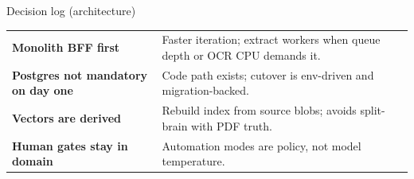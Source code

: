 \documentclass[aspectratio=169,11pt]{beamer}
\begin{document}
\begin{frame}{Decision log (architecture)}
  \small
  \begin{tabular}{p{3.3cm}p{8.2cm}}
    \textbf{Monolith BFF first} & Faster iteration; extract workers when queue depth or OCR CPU demands it. \\
    \textbf{Postgres not mandatory on day one} & Code path exists; cutover is env-driven and migration-backed. \\
    \textbf{Vectors are derived} & Rebuild index from source blobs; avoids split-brain with PDF truth. \\
    \textbf{Human gates stay in domain} & Automation modes are policy, not model temperature. \\
  \end{tabular}
\end{frame}
\end{document}
